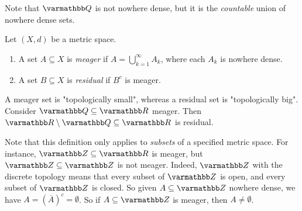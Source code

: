     Note that $\bfQ$ is not nowhere dense, but it is the \textit{countable} union of nowhere dense sets.

    \begin{definition}
        Let $(X,d)$ be a metric space.
            \begin{enumerate}[label = (\arabic*),itemsep=1pt,topsep=3pt]
                \item A set $A \subseteq X$ is \textit{meager} if $A = \bigcup_{k = 1}^\infty A_k$, where each $A_k$ is nowhere dense.
                \item A set $B \subseteq X$ is \textit{residual} if $B^c$ is meager.
            \end{enumerate}
    \end{definition}

    \begin{example}
        A meager set is "topologically small", whereas a residual set is "topologically big". Consider $\bfQ \subseteq \bfR$ meager. Then $\bfR\setminus \bfQ \subseteq \bfR$ is residual.

        Note that this definition only applies to \textit{subsets} of a specified metric space. For instance, $\bfZ \subseteq \bfR$ is meager, but $\bfZ \subseteq \bfZ$ is not meager. Indeed, $\bfZ$ with the discrete topology means that every subset of $\bfZ$ is open, and every subset of $\bfZ$ is closed. So given $A \subseteq \bfZ$ nowhere dense, we have $A = (\overline{A})^c = \emptyset$. So if $A \subseteq \bfZ$ is meager, then $A \neq \emptyset$.
    \end{example}

